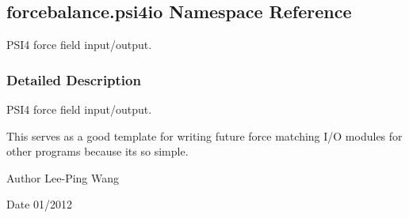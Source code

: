 \hypertarget{namespaceforcebalance_1_1psi4io}{}\subsection{forcebalance.\+psi4io Namespace Reference}
\label{namespaceforcebalance_1_1psi4io}


P\+S\+I4 force field input/output.  




\subsubsection{Detailed Description}
P\+S\+I4 force field input/output. 

This serves as a good template for writing future force matching I/O modules for other programs because it\textquotesingle{}s so simple.

\begin{DoxyAuthor}{Author}
Lee-\/\+Ping Wang 
\end{DoxyAuthor}
\begin{DoxyDate}{Date}
01/2012 
\end{DoxyDate}
